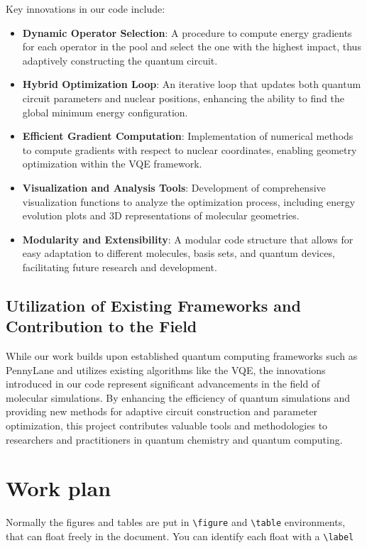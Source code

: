 Key innovations in our code include:

\begin{itemize} \item \textbf{Dynamic Operator Selection}: A procedure to compute energy gradients for each operator in the pool and select the one with the highest impact, thus adaptively constructing the quantum circuit. \item \textbf{Hybrid Optimization Loop}: An iterative loop that updates both quantum circuit parameters and nuclear positions, enhancing the ability to find the global minimum energy configuration. \item \textbf{Efficient Gradient Computation}: Implementation of numerical methods to compute gradients with respect to nuclear coordinates, enabling geometry optimization within the VQE framework. \item \textbf{Visualization and Analysis Tools}: Development of comprehensive visualization functions to analyze the optimization process, including energy evolution plots and 3D representations of molecular geometries. \item \textbf{Modularity and Extensibility}: A modular code structure that allows for easy adaptation to different molecules, basis sets, and quantum devices, facilitating future research and development. \end{itemize}

\subsection*{Utilization of Existing Frameworks and Contribution to the Field}

While our work builds upon established quantum computing frameworks such as PennyLane and utilizes existing algorithms like the VQE, the innovations introduced in our code represent significant advancements in the field of molecular simulations. By enhancing the efficiency of quantum simulations and providing new methods for adaptive circuit construction and parameter optimization, this project contributes valuable tools and methodologies to researchers and practitioners in quantum chemistry and quantum computing.

\section{Work plan}

  \label{sec:workplan}

Normally the figures and tables are put in \verb|\figure| and \verb|\table| environments, that can float freely in the document. You can identify each float with a \verb|\label|


